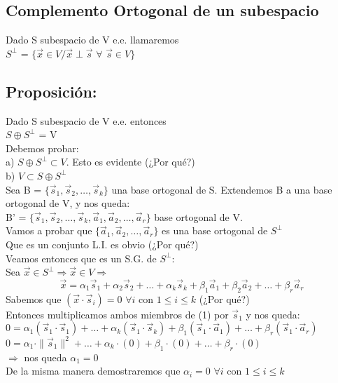 \documentclass[11pt]{article}
\begin{document}
\subsection{Complemento Ortogonal de un subespacio}
Dado S subespacio de V e.e. llamaremos\\
$S^{\perp}$ = $\{\vec{x} \in V / \vec{x} \perp \vec{s}$ $\forall$ $\vec{s} \in V\}$ 
\subsection{Proposición:}
Dado S subespacio de V e.e. entonces\\
$S \oplus S^{\perp} $ = V \\
Debemos probar: \\
a) $S \oplus S^{\perp} \subset V$. Esto es evidente (¿Por qué?)\\
b) $V \subset S \oplus S^{\perp}$\\
Sea B = $\{\vec{s}_1,\vec{s}_2,\hdots,\vec{s}_k\}$ una base ortogonal de S. Extendemos B a una base ortogonal de V, y nos queda:\\
B' = $\{\vec{s}_1,\vec{s}_2,\hdots,\vec{s}_k,\vec{a}_1,\vec{a}_2,\hdots,\vec{a}_r\}$ base ortogonal de V. \\
Vamos a probar que $\{\vec{a}_1,\vec{a}_2,\hdots,\vec{a}_r\}$ es una base ortogonal de $S^{\perp}$\\
Que es un conjunto L.I. es obvio (¿Por qué?)\\
Veamos entonces que es un S.G. de $S^{\perp}$:\\
Sea $\vec{x} \in S^{\perp} \Rightarrow \vec{x} \in V \Rightarrow$
\begin{equation}
\vec{x} = \alpha_1\vec{s}_1 + \alpha_2\vec{s}_2+\hdots+\alpha_k\vec{s}_k+\beta_1\vec{a}_1+\beta_2\vec{a}_2+\hdots+\beta_r\vec{a}_r
\end{equation}
Sabemos que $(\vec{x}\cdot\vec{s}_i)=0$ $\forall i$ con $1 \leq i \leq k $ (¿Por qué?)\\
Entonces multiplicamos ambos miembros de (1) por $\vec{s}_1$ y nos queda: \\
$0=\alpha_1(\vec{s}_1\cdot\vec{s}_1) + \hdots + \alpha_k(\vec{s}_1\cdot\vec{s}_k) + \beta_1(\vec{s}_1\cdot\vec{a}_1) + \hdots + \beta_r(\vec{s}_1\cdot\vec{a}_r)$\\
$0=\alpha_1\cdot\parallel\vec{s}_1\parallel^2 + \hdots + \alpha_k\cdot(0) + \beta_1\cdot(0) + \hdots + \beta_r\cdot(0)$\\
$\Rightarrow$ nos queda $\alpha_1=0$\\
De la misma manera demostraremos que $\alpha_i = 0$ $\forall i$   con $1 \leq i \leq k$\\
\end{document}
